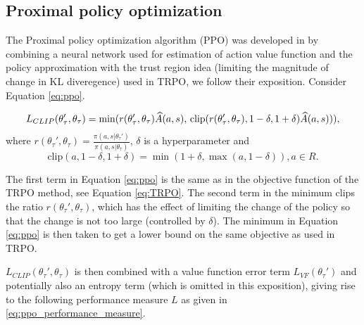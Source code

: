 \subsection{Proximal policy optimization}
The Proximal policy optimization algorithm (PPO) was developed in \cite{proximal_policy_optimization} by combining a neural network used for estimation of action value function and the policy approximation with the trust region idea (limiting the magnitude of change in KL diveregence) used in TRPO, we follow their exposition. Consider Equation \ref{eq:ppo}.

\begin{equation}
\label{eq:ppo}
\footnotesize	
 L_{CLIP}(\theta_{\tau}', \theta_{\tau}) = \min(r(\theta_{\tau}',\theta_{\tau})\widehat{A}(a, s), \, \mathrm{clip}(r(\theta_{\tau}',\theta_{\tau}), 1-\delta, 1+\delta)\widehat{A}(a, s))),
\end{equation}
where $r(\theta_{\tau}',\theta_{\tau}) = \frac{\pi(a, s|\theta_{\tau}')}{\pi(a, s|\theta_{\tau})}$, $\delta$ is a hyperparameter and 
\begin{equation*}
\mathrm{clip}(a, 1-\delta, 1+\delta) = \min(1+\delta, \max(a,1-\delta)), a \in R.
\end{equation*}

The first term in Equation \ref{eq:ppo} is the same as in the objective function of the TRPO method, see Equation \ref{eq:TRPO}. The second term in the minimum clips the ratio $r(\theta_{\tau}',\theta_{\tau})$, which  has the effect of limiting the change of the policy so that the change is not too large (controlled by $\delta$). The minimum in Equation \ref{eq:ppo} is then taken to get a lower bound on the same objective as used in TRPO.

$L_{CLIP}(\theta_{\tau}', \theta_{\tau})$ is then combined with a value function error term $L_{VF}(\theta_{\tau}')$ and potentially also an entropy term (which is omitted in this exposition), giving rise to the following performance measure $L$ as given in \ref{eq:ppo_performance_measure}.

